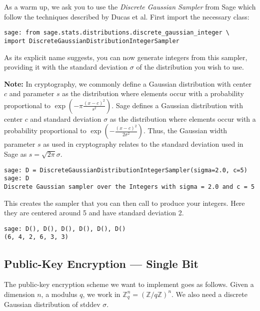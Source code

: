 \documentclass[10pt,a4paper,nobib]{tufte-handout}
\begin{document}
As a warm up, we ask you to use the \textit{Discrete Gaussian Sampler} from Sage which follow the techniques described by Ducas et al. First import the necessary class:

\lstset{language=sage,label= ,caption= ,captionpos=b,numbers=none}
\begin{lstlisting}
sage: from sage.stats.distributions.discrete_gaussian_integer \
import DiscreteGaussianDistributionIntegerSampler
\end{lstlisting}

As its explicit name suggests, you can now generate integers from this sampler, providing it with the standard deviation $\sigma$ of the distribution you wish to use.

\textbf{Note:} In cryptography, we commonly define a Gaussian distribution with center $c$ and parameter $s$ as the distribution where elements occur with a probability proportional to $\exp(-\pi\frac{{(x-c)}^2}{s^2})$. Sage defines a Gaussian distribution with center \(c\) and standard deviation \(\sigma\) as the distribution where elements occur with a probability proportional to $\exp(-\frac{{(x-c)}^2}{2\sigma^2})$. Thus, the Gaussian width parameter \(s\) as used in cryptography relates to the standard deviation used in Sage as \(s = \sqrt{2\pi}\sigma\).

\lstset{language=sage,label= ,caption= ,captionpos=b,numbers=none}
\begin{lstlisting}
sage: D = DiscreteGaussianDistributionIntegerSampler(sigma=2.0, c=5)
sage: D
Discrete Gaussian sampler over the Integers with sigma = 2.0 and c = 5
\end{lstlisting}

This creates the sampler that you can then call to produce your integers. Here they are centered around 5 and have standard deviation 2.

\lstset{language=sage,label= ,caption= ,captionpos=b,numbers=none}
\begin{lstlisting}
sage: D(), D(), D(), D(), D(), D()
(6, 4, 2, 6, 3, 3)
\end{lstlisting}

\subsection{Public-Key Encryption --- Single Bit}

The public-key encryption scheme we want to implement goes as follows. Given a dimension $n$, a modulus $q$, we work in $\mathbb{Z}^n_q = (\mathbb{Z}/q\mathbb{Z})^n$. We also need a discrete Gaussian distribution of stddev $\sigma$.
\end{document}
